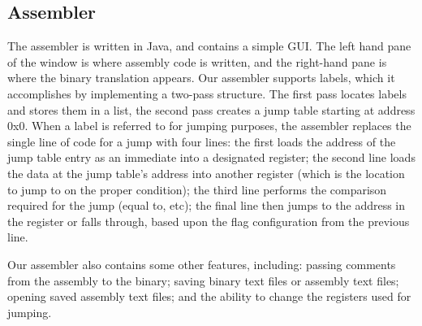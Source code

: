 \documentclass[onecolumn, 12pt]{IEEEtran}
\begin{document}
\subsection{Assembler}
	The assembler is written in Java, and contains a simple GUI.  The left hand pane of the window is where assembly code is written, and the right-hand pane is where the binary translation appears.  Our assembler supports labels, which it accomplishes by implementing a two-pass structure.  The first pass locates labels and stores them in a list, the second pass creates a jump table starting at address 0x0.  When a label is referred to for jumping purposes, the assembler replaces the single line of code for a jump with four lines: the first loads the address of the jump table entry as an immediate into a designated register; the second line loads the data at the jump table's address into another register (which is the location to jump to on the proper condition); the third line performs the comparison required for the jump (equal to, etc);  the final line then jumps to the address in the register or falls through, based upon the flag configuration  from the previous line.
	\par
	Our assembler also contains some other features, including: passing comments from the assembly to the binary; saving binary text files or assembly text files; opening saved assembly text files; and the ability to change the registers used for jumping.
\end{document}
